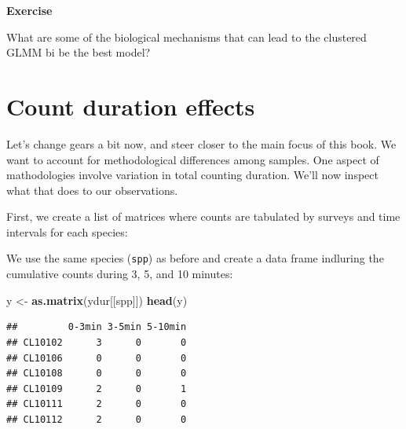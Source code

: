 \documentclass[12pt,]{book}
\newenvironment{Shaded}{\begin{snugshade}}{\end{snugshade}}
\newcommand{\KeywordTok}[1]{\textcolor[rgb]{0.13,0.29,0.53}{\textbf{#1}}}
\newcommand{\NormalTok}[1]{#1}
\newcommand{\OperatorTok}[1]{\textcolor[rgb]{0.81,0.36,0.00}{\textbf{#1}}}
\newcommand{\StringTok}[1]{\textcolor[rgb]{0.31,0.60,0.02}{#1}}
\let\BeginKnitrBlock\begin \let\EndKnitrBlock\end
\begin{document}
\BeginKnitrBlock{rmdexercise}
\textbf{Exercise}

What are some of the biological mechanisms that can lead to the
clustered GLMM bi be the best model?
\EndKnitrBlock{rmdexercise}

\hypertarget{count-duration-effects}{%
\section{Count duration effects}\label{count-duration-effects}}

Let's change gears a bit now, and steer closer to the main focus
of this book. We want to account for methodological differences
among samples. One aspect of mathodologies involve
variation in total counting duration. We'll now inspect what
that does to our observations.

First, we create a list of matrices where counts are
tabulated by surveys and time intervals for each species:

\begin{Shaded}
\end{Shaded}

We use the same species (\texttt{spp}) as before and create a
data frame indluring the cumulative counts during 3, 5, and 10 minutes:

\begin{Shaded}
\begin{Highlighting}[]
\NormalTok{y <-}\StringTok{ }\KeywordTok{as.matrix}\NormalTok{(ydur[[spp]])}
\KeywordTok{head}\NormalTok{(y)}
\end{Highlighting}
\end{Shaded}

\begin{verbatim}
##         0-3min 3-5min 5-10min
## CL10102      3      0       0
## CL10106      0      0       0
## CL10108      0      0       0
## CL10109      2      0       1
## CL10111      2      0       0
## CL10112      2      0       0
\end{verbatim}
\end{document}
